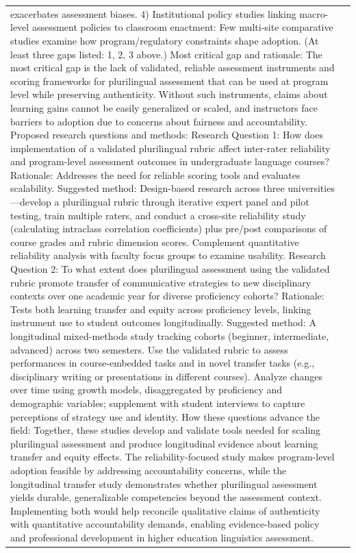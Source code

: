 \begin{longtable}{@{}l p{12.5cm}@{}}
exacerbates assessment biases. 4) Institutional policy studies linking macro-level assessment policies to classroom enactment: Few multi-site comparative studies examine how program/regulatory constraints shape adoption. (At least three gaps listed: 1, 2, 3 above.) Most critical gap and rationale: The most critical gap is the lack of validated, reliable assessment instruments and scoring frameworks for plurilingual assessment that can be used at program level while preserving authenticity. Without such instruments, claims about learning gains cannot be easily generalized or scaled, and instructors face barriers to adoption due to concerns about fairness and accountability. Proposed research questions and methods: Research Question 1: How does implementation of a validated plurilingual rubric affect inter-rater reliability and program-level assessment outcomes in undergraduate language courses? Rationale: Addresses the need for reliable scoring tools and evaluates scalability. Suggested method: Design-based research across three universities---develop a plurilingual rubric through iterative expert panel and pilot testing, train multiple raters, and conduct a cross-site reliability study (calculating intraclass correlation coefficients) plus pre/post comparisons of course grades and rubric dimension scores. Complement quantitative reliability analysis with faculty focus groups to examine usability. Research Question 2: To what extent does plurilingual assessment using the validated rubric promote transfer of communicative strategies to new disciplinary contexts over one academic year for diverse proficiency cohorts? Rationale: Tests both learning transfer and equity across proficiency levels, linking instrument use to student outcomes longitudinally. Suggested method: A longitudinal mixed-methods study tracking cohorts (beginner, intermediate, advanced) across two semesters. Use the validated rubric to assess performances in course-embedded tasks and in novel transfer tasks (e.g., disciplinary writing or presentations in different courses). Analyze changes over time using growth models, disaggregated by proficiency and demographic variables; supplement with student interviews to capture perceptions of strategy use and identity. How these questions advance the field: Together, these studies develop and validate tools needed for scaling plurilingual assessment and produce longitudinal evidence about learning transfer and equity effects. The reliability-focused study makes program-level adoption feasible by addressing accountability concerns, while the longitudinal transfer study demonstrates whether plurilingual assessment yields durable, generalizable competencies beyond the assessment context. Implementing both would help reconcile qualitative claims of authenticity with quantitative accountability demands, enabling evidence-based policy and professional development in higher education linguistics assessment. \\

\end{longtable}
